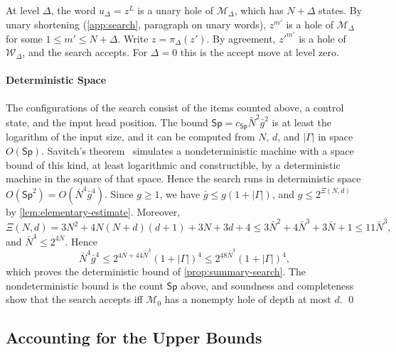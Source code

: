 At level $\Delta$, the word $u_\Delta=z^L$ is a unary hole of $\mathcal M_\Delta$,
which has $N+\Delta$ states. By unary shortening (\cref{app:search}, paragraph on
unary words), $z^{m'}$ is a hole of $\mathcal M_\Delta$ for some
$1\le m'\le N+\Delta$. Write $z=\pi_\Delta(z')$. By agreement, $z'^{m'}$ is a hole of
$\mathcal W_\Delta$, and the search accepts. For $\Delta=0$ this is the accept move at
level zero.

\paragraph{Deterministic Space}
The configurations of the search consist of the items counted above, a
control state, and the input head position. The bound
$\mathsf{Sp}=c_{\mathsf{Sp}}\bar N^2\bar g^2$ is at least the logarithm of
the input size, and it can be computed from $N$, $d$, and $|\Gamma|$ in space
$O(\mathsf{Sp})$. Savitch's theorem~\citep{Savitch70} simulates a
nondeterministic machine with a space bound of this kind, at least
logarithmic and constructible, by a deterministic machine in the square of
that space. Hence the search runs in deterministic space
$O(\mathsf{Sp}^2)=O(\bar N^4\bar g^4)$. Since $g\ge1$, we have
$\bar g\le g(1+|\Gamma|)$, and $g\le2^{\Xi(N,d)}$ by
\cref{lem:elementary-estimate}. Moreover,
\[
 \Xi(N,d)=3N^2+4N(N+d)(d+1)+3N+3d+4\le3\bar N^2+4\bar N^3+3\bar N+1
 \le11\bar N^3,
\]
and $\bar N^4\le2^{4\bar N}$. Hence
\[
 \bar N^4\bar g^4\le2^{4\bar N+44\bar N^3}(1+|\Gamma|)^4
 \le2^{48\bar N^3}(1+|\Gamma|)^4,
\]
which proves the deterministic bound of \cref{prop:summary-search}. The
nondeterministic bound is the count $\mathsf{Sp}$ above, and soundness and
completeness show that the search accepts iff $\mathcal M_0$ has a nonempty
hole of depth at most $d$.
\qed

\subsection{Accounting for the Upper Bounds}

